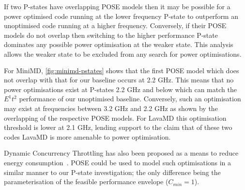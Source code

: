 If two P-states have overlapping POSE models then it may be possible for a power optimised code running at the lower frequency P-state to outperform an unoptimised code running at a higher frequency.
Conversely, if their POSE models do not overlap then switching to the higher performance P-state dominates any possible power optimisation at the weaker state.
This analysis allows the weaker state to be excluded from any search for power optimisations.

For MiniMD, \autoref{fig:minimd-pstates} shows that the first POSE model which does not overlap with that for our baseline occurs at 2.2 GHz.
This means that no power optimisations exist at P-states 2.2 GHz and below which can match the $E^1t^2$ performance of our unoptimised baseline.
Conversely, such an optimisation may exist at frequencies between 3.2 GHz and 2.2 GHz as shown by the overlapping of the respective POSE models.
For LavaMD this optimisation threshold is lower at 2.1 GHz, lending support to the claim that of these two codes LavaMD is more amenable to power optimisation.

Dynamic Concurrency Throttling has also been proposed as a means to reduce energy consumption~\cite{maury:2006aa}.
POSE could be used to model such optimisations in a similar manner to our P-state investigation; the only difference being the parameterisation of the feasible performance envelope ($C_{min}=1$).
